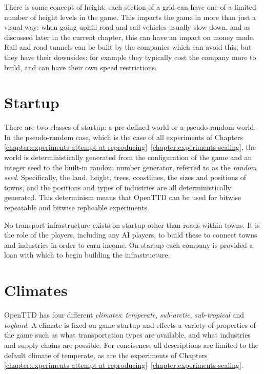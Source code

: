 \documentclass[logo,msc,dsti]{style/infthesis}    %
\begin{document}
{There is some concept of height: each section of a grid can have one of a limited number of height levels in the game. This impacts the game in more than just a visual way: when going uphill road and rail vehicles usually slow down, and as discussed later in the current chapter, this can have an impact on money made. Rail and road tunnels can be built by the companies which can avoid this, but they have their downsides: for example they typically cost the company more to build, and can have their own speed restrictions.

\section{Startup}

There are two classes of startup: a pre-defined world or a pseudo-random world. In the pseudo-random case, which is the case of all experiments of Chapters \ref{chapter:experiments-attempt-at-reproducing}--\ref{chapter:experiments-scaling}, the world is deterministically generated from  the configuration of the game and an integer seed to the built-in random number generator, referred to as the \emph{random seed}. Specifically, the land, height, trees, coastlines, the sizes and positions of towns, and the positions and types of industries are all deterministically generated. This determinism means that OpenTTD can be used for bitwise repeatable and bitwise replicable experiments.

No transport infrastructure exists on startup other than roads within towns. It is the role of the players, including any AI players, to build these to connect towns and industries in order to earn income. On startup each company is provided a loan with which to begin building the infrastructure.

\section{Climates}

OpenTTD has four different \emph{climates}: \emph{temperate}, \emph{sub-arctic}, \emph{sub-tropical} and \emph{toyland}. A climate is fixed on game startup and effects a variety of properties of the game such as what transportation types are available, and what industries and supply chains are possible. For conciseness all descriptions are limited to the default climate of temperate, as are the experiments of Chapters \ref{chapter:experiments-attempt-at-reproducing}--\ref{chapter:experiments-scaling}.

}
\end{document}
